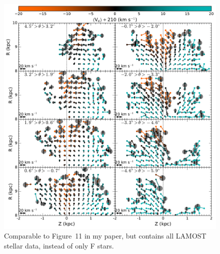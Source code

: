 \documentclass{article}
\begin{document}
\begin{figure}
\centering
\includegraphics[width=\textwidth]{stepthetaL.pdf}
\caption{
	Comparable to Figure~11 in my paper, but contains all LAMOST stellar data, instead of only F stars. 
	\label{fig:stepthetaL}
}
\end{figure}
\end{document}
